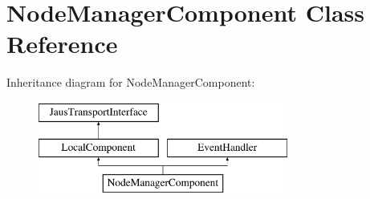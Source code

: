 \hypertarget{class_node_manager_component}{\section{\-Node\-Manager\-Component \-Class \-Reference}
\label{class_node_manager_component}
}
\-Inheritance diagram for \-Node\-Manager\-Component\-:\begin{figure}[H]
\begin{center}
\leavevmode
\includegraphics[height=3.000000cm]{class_node_manager_component}
\end{center}
\end{figure}
